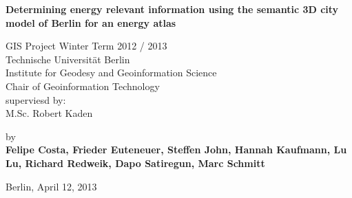 \begin{center}
\vspace*{\fill}

    {\Large{\bf Determining energy relevant information using the semantic 3D city model of Berlin for an energy atlas}} \vspace{0.5cm}


    {\normalsize GIS Project Winter Term 2012 / 2013}\\\vspace{0.5cm}
    {\normalsize Technische Universit\"at Berlin \\
    Institute for Geodesy and Geoinformation Science \\
	Chair of Geoinformation Technology\\
	superviesd by:\\	
	M.Sc. Robert Kaden}\vspace{1cm}

    {\normalsize by \\\vspace{0.5cm}
    {\bf Felipe Costa, Frieder Euteneuer, Steffen John, Hannah Kaufmann, Lu Lu, Richard Redweik, Dapo Satiregun, Marc Schmitt}} \vspace{1cm}


    {\normalsize Berlin, April 12, 2013}
\vfill
\end{center}
